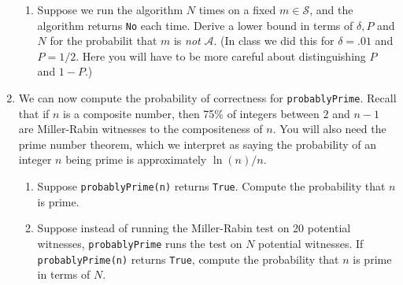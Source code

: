 \documentclass[11pt]{article}
\newcommand{\cS}{\mathcal{S}}
\newcommand{\sA}{\mathscr{A}}
\begin{document}
\begin{enumerate}
{\begin{enumerate}
    \item{
    Suppose we run the algorithm $N$ times on a fixed $m\in\cS$, and the algorithm returns \verb|No| each time.  Derive a lower bound in terms of $\delta,P$ and $N$ for the probabilit that $m$ is \textit{not} $\sA$.  (In class we did this for $\delta = .01$ and $P=1/2$.  Here you will have to be more careful about distinguishing $P$ and $1-P$.)
    }
  \end{enumerate}
  }
  \item{
  We can now compute the probability of correctness for \verb|probablyPrime|.  Recall that if $n$ is a composite number, then 75\% of integers between $2$ and $n-1$ are Miller-Rabin witnesses to the compositeness of $n$.  You will also need the prime number theorem, which we interpret as saying the probability of an integer $n$ being prime is approximately $\ln(n)/n$.
  \begin{enumerate}
    \item{
    Suppose \verb|probablyPrime(n)| returns \verb|True|.  Compute the probability that $n$ is prime.
    }
    \item{
    Suppose instead of running the Miller-Rabin test on 20 potential witnesses, \verb|probablyPrime| runs the test on $N$ potential witnesses.  If \verb|probablyPrime(n)| returns \verb|True|, compute the probability that $n$ is prime in terms of $N$.
    }
  \end{enumerate}
  }

\end{enumerate}
\end{document}
